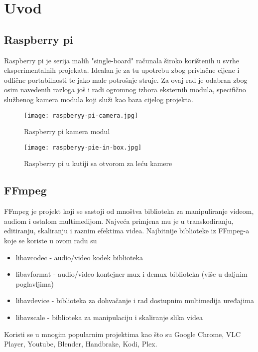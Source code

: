 \section{Uvod}
\subsection{Raspberry pi}
Raspberry pi je serija malih "single-board" računala široko korištenih u svrhe eksperimentalnih projekata.
\paraBreak
Idealan je za tu upotrebu zbog privlačne cijene i odlične portabilnosti te jako male potrošnje struje.
\paraBreak
Za ovaj rad je odabran zbog osim navedenih razloga još i radi ogromnog izbora eksternih modula, specifično službenog kamera modula
koji služi kao baza cijelog projekta.

\begin{figure}[ht]
  \centering
  \texttt{[image: raspberyy-pi-camera.jpg]}
  \caption{Raspberry pi kamera modul}
\end{figure}

\begin{figure}[ht]
  \centering
  \texttt{[image: raspberyy-pie-in-box.jpg]}
  \caption{Raspberry pi u kutiji sa otvorom za leću kamere}
\end{figure}

\clearpage
\subsection{FFmpeg}
FFmpeg je  projekt koji se sastoji od mnoštva biblioteka za manipuliranje videom, audiom i ostalom multimedijom.
\paraBreak
Najveća primjena mu je u transkodiranju, editiranju, skaliranju i raznim efektima videa.
\paraBreak
Najbitnije biblioteke iz FFmpeg-a koje se koriste u ovom radu su
\begin{itemize}
  \item libavcodec - audio/video kodek biblioteka
  \item libavformat - audio/video kontejner mux i demux biblioteka (više u daljnim poglavljima)
  \item libavdevice - biblioteka za dohvačanje i rad dostupnim multimedija uređajima
  \item libavscale - biblioteka za manipulaciju i skaliranje slika videa
\end{itemize}
Koristi se u mnogim popularnim projektima kao što su Google Chrome, VLC Player, Youtube, Blender, Handbrake, Kodi, Plex.
